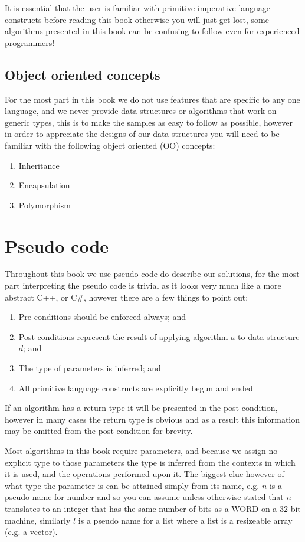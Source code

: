 It is essential that the user is familiar with primitive imperative language constructs before reading this book otherwise you will just get lost, some algorithms presented in this book can be confusing to follow even for experienced programmers!

\subsection{Object oriented concepts}
For the most part in this book we do not use features that are specific to any one language, and we never provide data structures or algorithms that work on generic types, this is to make the samples as easy to follow as possible, however in order to appreciate the designs of our data structures you will need to be familiar with the following object oriented (OO) concepts:

\begin{enumerate}
\item Inheritance
\item Encapsulation
\item Polymorphism
\end{enumerate}

\section{Pseudo code}
Throughout this book we use pseudo code do describe our solutions, for the most part interpreting the pseudo code is trivial as it looks very much like a more abstract C++, or C\#, however there are a few things to point out:

\begin{enumerate}
\item Pre-conditions should be enforced always; and
\item Post-conditions represent the result of applying algorithm $a$ to data structure $d$; and
\item The type of parameters is inferred; and
\item All primitive language constructs are explicitly begun and ended
\end{enumerate}

If an algorithm has a return type it will be presented in the post-condition, however in many cases the return type is obvious and as a result this information may be omitted from the post-condition for brevity.

Most algorithms in this book require parameters, and because we assign no explicit type to those parameters the type is inferred from the contexts in which it is used, and the operations performed upon it. The biggest clue however of what type the parameter is can be attained simply from its name, e.g. $n$ is a pseudo name for number and so you can assume unless otherwise stated that $n$ translates to an integer that has the same number of bits as a WORD on a $32$ bit machine, similarly $l$ is a pseudo name for a list where a list is a resizeable array (e.g. a vector).


